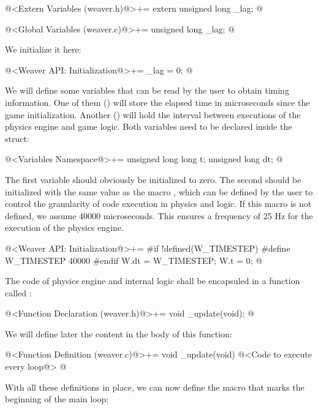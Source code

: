 \iniciocodigo
@<Extern Variables (weaver.h)@>+=
extern unsigned long _lag;
@
\fimcodigo

\iniciocodigo
@<Global Variables (weaver.c)@>+=
unsigned long _lag;
@
\fimcodigo

We initialize it here:

\iniciocodigo
@<Weaver API: Initialization@>+=
_lag = 0;
@
\fimcodigo

We will define some variables that can be read by the user to obtain
timing information. One of them () will store the
elapsed time in microseconds since the game initialization. Another
() will hold the interval between executions of the
physics engine and game logic. Both variables need to be declared
inside the  struct:

\iniciocodigo
@<Variables Namespace@>+=
unsigned long long t;
unsigned long dt;
@
\fimcodigo

The first variable should obviously be initialized to zero. The second
should be initialized with the same value as the
macro , which can be defined by the user to
control the granularity of code execution in physics and logic. If
this macro is not defined, we assume 40000 microseconds. This ensures
a frequency of 25 Hz for the execution of the physics engine.

\iniciocodigo
@<Weaver API: Initialization@>+=
#if !defined(W_TIMESTEP)
#define W_TIMESTEP 40000
#endif
W.dt = W_TIMESTEP;
W.t = 0;
@
\fimcodigo

The code of physics engine and internal logic shall be encapsuled in a
function called :

\iniciocodigo
@<Function Declaration (weaver.h)@>+=
void _update(void);
@
\fimcodigo

We will define later the content in the body of this function:

\iniciocodigo
@<Function Definition (weaver.c)@>+=
void _update(void){
  @<Code to execute every loop@>
}
@
\fimcodigo

With all these definitions in place, we can now define the macro that
marks the beginning of the main loop:


